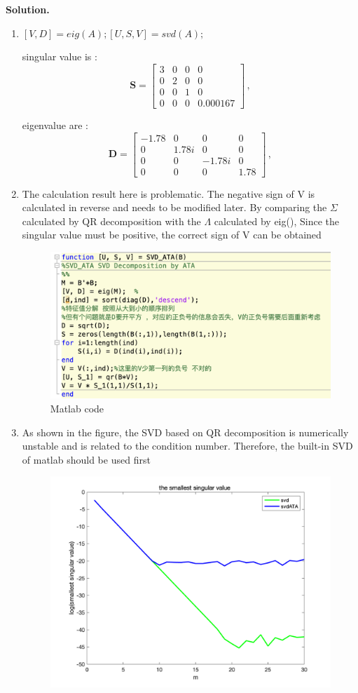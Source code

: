 \documentclass[english,onecolumn]{IEEEtran}
\begin{document}
\noindent
\textbf{Solution.}
\begin{enumerate}
	\item $[V,D] = eig(A);	[U, S, V] = svd(A);$
	
	singular value is :
	\[
	\mathbf{S} = \begin{bmatrix}
		3	&0	&0	&0\\
		0	&2	&0	&0\\
		0	&0	&1	&0\\
		0	&0	&0	&0.000167
	\end{bmatrix}\,,
	\]
	
	
	eigenvalue  are :
	\[
	\mathbf{D} = \begin{bmatrix}
		-1.78& 0 &0 &0\\
		0 &1.78i &0 &0\\
		0 &0 &-1.78i &0\\
		0 &0 &0 &1.78
	\end{bmatrix}\,,
	\]
	
	\item  The calculation result here is problematic. The negative sign of V is calculated in reverse and needs to be modified later. By comparing the $\Sigma$ calculated by QR decomposition with the $\Lambda$ calculated by eig(), Since the singular value must be positive, the correct sign of V can be obtained
\begin{figure}[h]
	\centering
	\includegraphics[width=0.7\linewidth]{figures/problem2.png}
	\caption{Matlab code}
	\label{fig:my_label}
\end{figure}
\item 
As shown in the figure, the SVD based on QR decomposition is numerically unstable and is related to the condition number. Therefore, the built-in SVD of matlab should be used first
\begin{figure}[h]
	\centering
	\includegraphics[width=0.7\linewidth]{figures/problem23}
	\caption{}
	\label{fig:problem23}
	
	
\end{figure}

	\end{enumerate}
\clearpage
\newpage
\end{document}
